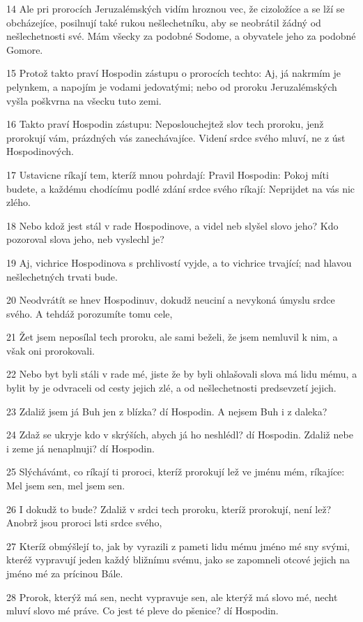 \par 14 Ale pri prorocích Jeruzalémských vidím hroznou vec, že cizoložíce a se lží se obcházejíce, posilnují také rukou nešlechetníku, aby se neobrátil žádný od nešlechetnosti své. Mám všecky za podobné Sodome, a obyvatele jeho za podobné Gomore.
\par 15 Protož takto praví Hospodin zástupu o prorocích techto: Aj, já nakrmím je pelynkem, a napojím je vodami jedovatými; nebo od proroku Jeruzalémských vyšla poškvrna na všecku tuto zemi.
\par 16 Takto praví Hospodin zástupu: Neposlouchejtež slov tech proroku, jenž prorokují vám, prázdných vás zanechávajíce. Videní srdce svého mluví, ne z úst Hospodinových.
\par 17 Ustavicne ríkají tem, kteríž mnou pohrdají: Pravil Hospodin: Pokoj míti budete, a každému chodícímu podlé zdání srdce svého ríkají: Neprijdet na vás nic zlého.
\par 18 Nebo kdož jest stál v rade Hospodinove, a videl neb slyšel slovo jeho? Kdo pozoroval slova jeho, neb vyslechl je?
\par 19 Aj, vichrice Hospodinova s prchlivostí vyjde, a to vichrice trvající; nad hlavou nešlechetných trvati bude.
\par 20 Neodvrátít se hnev Hospodinuv, dokudž neuciní a nevykoná úmyslu srdce svého. A tehdáž porozumíte tomu cele,
\par 21 Žet jsem neposílal tech proroku, ale sami beželi, že jsem nemluvil k nim, a však oni prorokovali.
\par 22 Nebo byt byli stáli v rade mé, jiste že by byli ohlašovali slova má lidu mému, a bylit by je odvraceli od cesty jejich zlé, a od nešlechetnosti predsevzetí jejich.
\par 23 Zdaliž jsem já Buh jen z blízka? dí Hospodin. A nejsem Buh i z daleka?
\par 24 Zdaž se ukryje kdo v skrýších, abych já ho neshlédl? dí Hospodin. Zdaliž nebe i zeme já nenaplnuji? dí Hospodin.
\par 25 Slýchávámt, co ríkají ti proroci, kteríž prorokují lež ve jménu mém, ríkajíce: Mel jsem sen, mel jsem sen.
\par 26 I dokudž to bude? Zdaliž v srdci tech proroku, kteríž prorokují, není lež? Anobrž jsou proroci lsti srdce svého,
\par 27 Kteríž obmýšlejí to, jak by vyrazili z pameti lidu mému jméno mé sny svými, kteréž vypravují jeden každý bližnímu svému, jako se zapomneli otcové jejich na jméno mé za prícinou Bále.
\par 28 Prorok, kterýž má sen, necht vypravuje sen, ale kterýž má slovo mé, necht mluví slovo mé práve. Co jest té pleve do pšenice? dí Hospodin.
